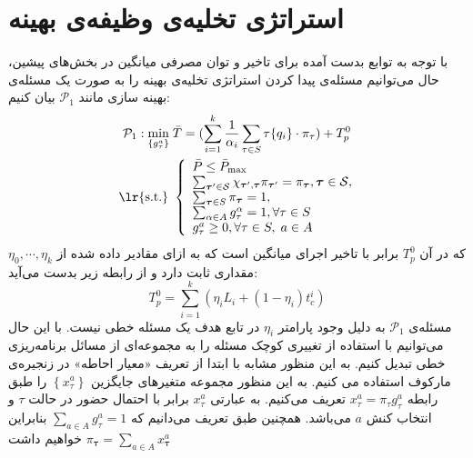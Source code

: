 \section{استراتژی تخلیه‌ی وظیفه‌ی بهینه}
\label{sec:strat}
با توجه به توابع بدست آمده برای تاخیر و توان مصرفی میانگین در بخش‌های پیشین، حال می‌توانیم مسئله‌ی پیدا کردن استراتژی تخلیه‌ی بهینه را به صورت یک مسئله‌ی بهینه سازی مانند
$\mathcal{P}_{1}$
بیان کنیم:
\begin{equation}
		\begin{aligned}
			\mathcal{P}_{1}: \min _{\left\{g_{\tau}^{a}\right\}}\; & \bar{T} = (\sum_{i=1}^{k} \frac{1}{\alpha_i} \sum_{\tau \in S} \tau\{q_i\} \cdot \pi_{\tau}) + T_p^0 \\
			\text { \lr{s.t.} } &\left\{\begin{array}{l}
				\bar{P} \leq \bar{P}_{\max } \\
				\sum_{\boldsymbol{\tau}^{\prime} \in \mathcal{S}} \chi_{\boldsymbol{\tau}^{\prime}, \boldsymbol{\tau}} \pi_{\boldsymbol{\tau}^{\prime}}=\pi_{\boldsymbol{\tau}}, \boldsymbol{\tau} \in \mathcal{S}, \\
				\sum_{\boldsymbol{\tau} \in S} \pi_{\boldsymbol{\tau}}=1, \\
				\sum_{\alpha \in A} g_{\tau}^{\alpha}=1, \forall \tau \in S\\
				g_{\tau}^{a} \geq 0, \forall \tau \in S,\;a \in A
			\end{array}\right.
		\end{aligned}
\end{equation}
که در آن
$T_p^0$
برابر با تاخیر اجرای میانگین است که به ازای مقادیر داده شده از
$\eta_0, \cdots, \eta_k$
مقداری ثابت دارد و از رابطه زیر بدست می‌آید:
\begin{equation}
	T_p^0 = \sum_{i=1}^{k} (\eta_i L_i+(1-\eta_i) t_{c}^i)
\end{equation}
مسئله‌ی
$\mathcal{P}_{1}$
به دلیل وجود پارامتر $\eta_i$ در تابع هدف یک مسئله خطی نیست. با این حال می‌توانیم با استفاده از تغییری کوچک مسئله را به مجموعه‌ای از مسائل برنامه‌ریزی خطی تبدیل کنیم. به این منظور مشابه با \cite{Liu} ابتدا از تعریف «معیار احاطه» در زنجیره‌ی مارکوف استفاده می کنیم. به این منظور مجموعه متغیرهای جایگزین $\left\{x_{\tau}^{a}\right\}$ را طبق رابطه $x_{\tau}^{a}=\pi_{\tau} g_{\tau}^{a}$ تعریف می‌کنیم. به عبارتی $x_{\tau}^{a}$ برابر با احتمال حضور در حالت $\tau$ و انتخاب کنش
$a$
می‌باشد. همچنین طبق تعریف می‌دانیم که
$\sum_{a \in A} g_{\tau}^{a}=1$
بنابراین خواهیم داشت
$\pi_{\boldsymbol{\tau}}=\sum_{a \in A} x_{\boldsymbol{\tau}}^{a}$
\\\\
